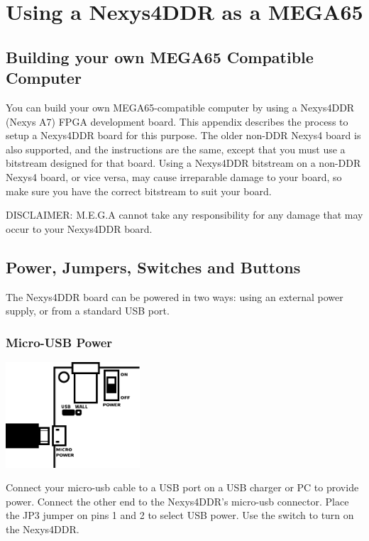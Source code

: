 \chapter{Using a Nexys4DDR as a MEGA65}

\section{Building your own MEGA65 Compatible Computer}

You can build your own MEGA65-compatible computer by using a Nexys4DDR (Nexys A7) FPGA development board.
This appendix describes the process to setup a Nexys4DDR board for this purpose.
The older non-DDR Nexys4 board is also supported, and the instructions are the same, except that
you must use a bitstream designed for that board.
Using a Nexys4DDR bitstream on a non-DDR Nexys4 board, or vice versa, may cause irreparable damage to your board, so make sure
you have the correct bitstream to suit your board.


DISCLAIMER: M.E.G.A cannot take any responsibility for any damage that may occur to your Nexys4DDR board.

\newpage

\section{Power, Jumpers, Switches and Buttons}

The Nexys4DDR board can be powered in two ways: using an external power supply, or from a standard USB port.

\subsection{Micro-USB Power}

\includegraphics[width=5cm]{images/illustrations/nexys-micro-usb-power.pdf}

Connect your micro-usb cable to a USB port on a USB charger or PC to provide power. Connect the other end to the Nexys4DDR's micro-usb connector. Place the JP3 jumper on pins 1 and 2 to select USB power. Use the switch to turn on the Nexys4DDR.

